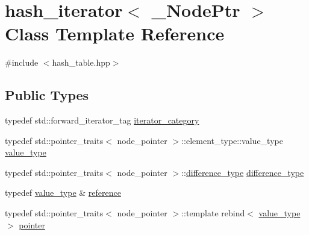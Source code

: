 \hypertarget{classhash__iterator}{}\section{hash\+\_\+iterator$<$ \+\_\+\+Node\+Ptr $>$ Class Template Reference}
\label{classhash__iterator}


{\ttfamily \#include $<$hash\+\_\+table.\+hpp$>$}

\subsection*{Public Types}
\begin{DoxyCompactItemize}
\item 
typedef std\+::forward\+\_\+iterator\+\_\+tag \hyperlink{classhash__iterator_ac7f22b21b9e812be82ff6e2d22aa5b22}{iterator\+\_\+category}
\item 
typedef std\+::pointer\+\_\+traits$<$ node\+\_\+pointer $>$\+::element\+\_\+type\+::value\+\_\+type \hyperlink{classhash__iterator_a2fe8b2e7a76ef651b9e3dd75e176d708}{value\+\_\+type}
\item 
typedef std\+::pointer\+\_\+traits$<$ node\+\_\+pointer $>$\+::\hyperlink{classhash__iterator_a594d7f0375d027ee463e7ab5d72cfe50}{difference\+\_\+type} \hyperlink{classhash__iterator_a594d7f0375d027ee463e7ab5d72cfe50}{difference\+\_\+type}
\item 
typedef \hyperlink{classhash__iterator_a2fe8b2e7a76ef651b9e3dd75e176d708}{value\+\_\+type} \& \hyperlink{classhash__iterator_aaa355159b91ef00385b0c4256e9a9eaf}{reference}
\item 
typedef std\+::pointer\+\_\+traits$<$ node\+\_\+pointer $>$\+::template rebind$<$ \hyperlink{classhash__iterator_a2fe8b2e7a76ef651b9e3dd75e176d708}{value\+\_\+type} $>$ \hyperlink{classhash__iterator_a7e43a9eb7cc16f1e13c47e3b76762bb7}{pointer}
\end{DoxyCompactItemize}

